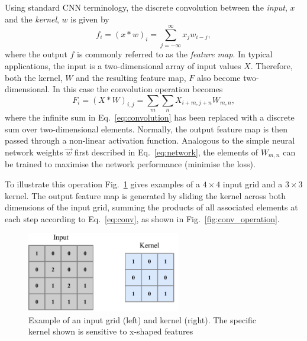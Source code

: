 Using standard CNN terminology, the discrete convolution between the \emph{input}, $x$ and the
\emph{kernel}, $w$ is given by
\begin{equation}
    f_{i}=(x*w)_{i}=\sum^{\infty}_{j=-\infty}x_{j}w_{i-j},
    \label{eq:convolution}
\end{equation}
where the output $f$ is commonly referred to as the \emph{feature map}. In typical applications,
the input is a two-dimensional array of input values $X$. Therefore, both the kernel, $W$ and the
resulting feature map, $F$ also become two-dimensional. In this case the convolution operation
becomes
\begin{equation}
    F_{i}=(X*W)_{i,j}=\sum_{m}\sum_{n}X_{i+m,j+n}W_{m,n},
    \label{eq:conv}
\end{equation}
where the infinite sum in Eq.~\ref{eq:convolution} has been replaced with a discrete sum over
two-dimensional elements. Normally, the output feature map is then passed through a non-linear
activation function. Analogous to the simple neural network weights $\vec{w}$ first described in
Eq.~\ref{eq:network}, the elements of $W_{m,n}$ can be trained to maximise the network performance
(minimise the loss).

To illustrate this operation Fig.~\ref{fig:conv_input} gives examples of a $4 \times 4$ input grid
and a $3 \times 3$ kernel. The output feature map is generated by sliding the kernel across both
dimensions of the input grid, summing the products of all associated elements at each step
according to Eq.~\ref{eq:conv}, as shown in Fig.~\ref{fig:conv_operation}.

\begin{figure} %
    \includegraphics[width=0.6\textwidth]{diagrams/6-cvn/conv_input.pdf}
    \caption[Example of an input grid and kernel.]
    {Example of an input grid (left) and kernel (right). The specific kernel shown is sensitive to
        x-shaped features}
    \label{fig:conv_input}
\end{figure}


